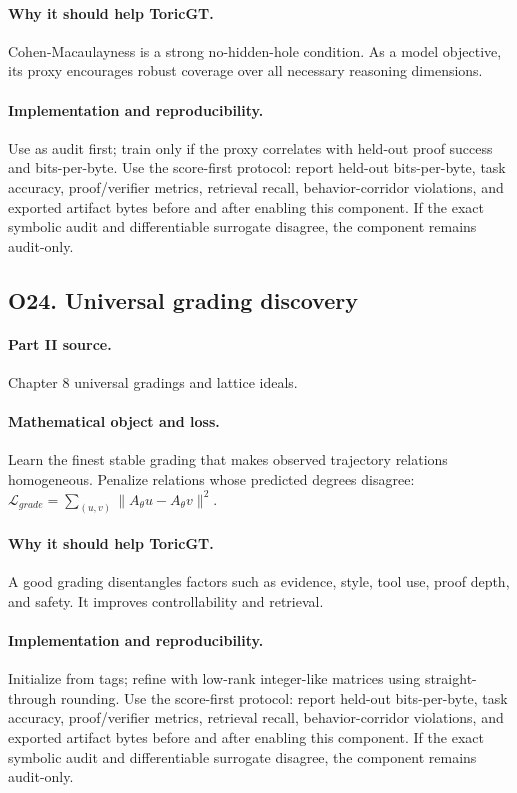 \documentclass[11pt]{article}
\theoremstyle{definition}
\begin{document}
\paragraph{Why it should help ToricGT.} Cohen-Macaulayness is a strong no-hidden-hole condition.  As a model objective, its proxy encourages robust coverage over all necessary reasoning dimensions.
\paragraph{Implementation and reproducibility.} Use as audit first; train only if the proxy correlates with held-out proof success and bits-per-byte.  Use the score-first protocol: report held-out bits-per-byte, task accuracy, proof/verifier metrics, retrieval recall, behavior-corridor violations, and exported artifact bytes before and after enabling this component.  If the exact symbolic audit and differentiable surrogate disagree, the component remains audit-only.


\subsection{O24. Universal grading discovery}
\paragraph{Part II source.} Chapter 8 universal gradings and lattice ideals.
\paragraph{Mathematical object and loss.} Learn the finest stable grading that makes observed trajectory relations homogeneous.  Penalize relations whose predicted degrees disagree: $\mathcal L_{grade}=\sum_{(u,v)}\|A_\theta u-A_\theta v\|^2$.
\paragraph{Why it should help ToricGT.} A good grading disentangles factors such as evidence, style, tool use, proof depth, and safety.  It improves controllability and retrieval.
\paragraph{Implementation and reproducibility.} Initialize from tags; refine with low-rank integer-like matrices using straight-through rounding.  Use the score-first protocol: report held-out bits-per-byte, task accuracy, proof/verifier metrics, retrieval recall, behavior-corridor violations, and exported artifact bytes before and after enabling this component.  If the exact symbolic audit and differentiable surrogate disagree, the component remains audit-only.
\end{document}
